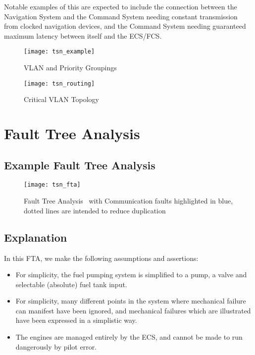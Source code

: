 Notable examples of this are expected to include the connection between the Navigation System and the Command System needing constant transmission from clocked navigation devices, and the Command System needing guaranteed maximum latency between itself and the ECS/FCS.

\begin{figure}[H]
\centering
\texttt{[image: tsn\_example]}
\caption{VLAN and Priority Groupings}
\label{fig:vlans}
\end{figure}

\begin{figure}[H]
\centering
\texttt{[image: tsn\_routing]}
\caption{Critical VLAN Topology}
\label{fig:topology}
\end{figure}


\section{Fault Tree Analysis}

\subsection{Example Fault Tree Analysis}


\begin{figure}[H]
\centering
\texttt{[image: tsn\_fta]}
\caption{Fault Tree Analysis~\cite{w.e.veselyFaultTreeHandbook1981} with Communication faults highlighted in blue, dotted lines are intended to reduce duplication}
\end{figure}

\subsection{Explanation}

In this FTA, we make the following assumptions and assertions:

\begin{itemize}
    \item For simplicity, the fuel pumping system is simplified to a pump, a valve and selectable (absolute) fuel tank input.
    \item For simplicity, many different points in the system where mechanical failure can manifest have been ignored, and mechanical failures which are illustrated have been expressed in a simplistic way.
    \item The engines are managed entirely by the ECS, and cannot be made to run dangerously by pilot error.
\end{itemize}

